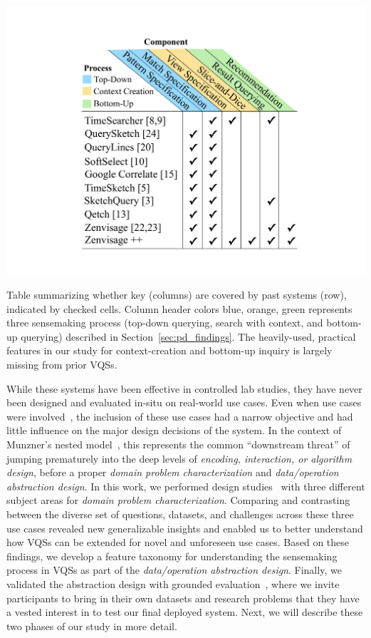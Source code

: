 \begin{table}
    \centering
    \includegraphics[width=0.8\linewidth]{figures/related_works_table.pdf}
    \caption{Table summarizing whether key  (columns) are covered by past systems (row), indicated by checked cells. Column header colors blue, orange, green represents three sensemaking process (top-down querying, search with context, and bottom-up querying) described in Section~\ref{sec:pd_findings}. The heavily-used, practical features in our study for context-creation and bottom-up inquiry is largely missing from prior VQSs.}
    \label{table:relatedwork}
    \vspace{-10pt}
\end{table}
\par While these systems have been effective in controlled lab studies, they have never been designed and evaluated in-situ on real-world use cases. Even when use cases were involved~\cite{Hochheiser2004,correll2016semantics}, the inclusion of these use cases had a narrow objective and had little influence on the major design decisions of the system. In the context of Munzner's nested model~\cite{munzner2009nested}, this represents the common ``downstream threat'' of jumping prematurely into the deep levels of \textit{encoding, interaction, or algorithm design}, before a proper \textit{domain problem characterization} and \textit{data/operation abstraction design}. In this work, we performed design studies~\cite{lam2012empirical,shneiderman2006strategies,Sedlmair2012} with three different subject areas for \textit{domain problem characterization}. Comparing and contrasting between the diverse set of questions, datasets, and challenges across these three use cases revealed new generalizable insights and enabled us to better understand how VQSs can be extended for novel and unforeseen use cases. Based on these findings, we develop a feature taxonomy for understanding the sensemaking process in VQSs as part of the \textit{data/operation abstraction design}. Finally, we validated the abstraction design with grounded evaluation~\cite{Plaisant2004,Isenberg2008}, where we invite participants to bring in their own datasets and research problems that they have a vested interest in to test our final deployed system. Next, we will describe these two phases of our study in more detail.
